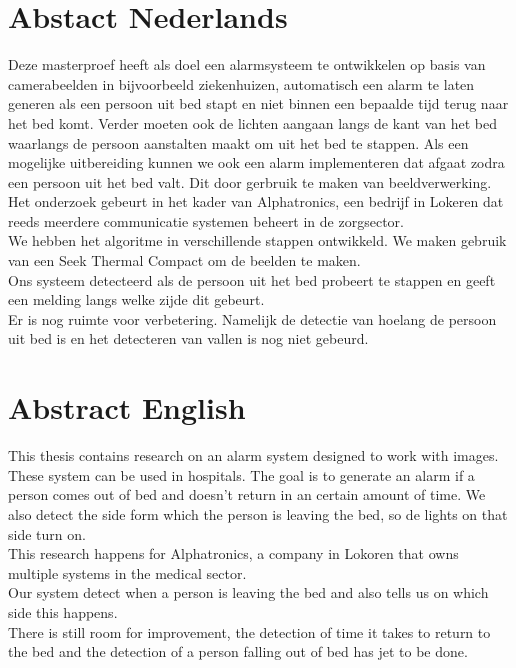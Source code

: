 \section{Abstact Nederlands}
Deze masterproef heeft als doel een alarmsysteem te ontwikkelen op basis van camerabeelden in bijvoorbeeld ziekenhuizen, automatisch een alarm te laten generen als een persoon uit bed stapt en niet binnen een bepaalde tijd terug naar het bed komt. Verder moeten ook de lichten aangaan langs de kant van het bed waarlangs de persoon aanstalten maakt om uit het bed te stappen.  Als een mogelijke uitbereiding kunnen we ook een alarm implementeren dat afgaat zodra een persoon uit het bed valt. Dit door gerbruik te maken van beeldverwerking.
Het onderzoek gebeurt in het kader van Alphatronics, een bedrijf in Lokeren dat reeds meerdere communicatie systemen beheert in de zorgsector.\\
 We hebben het algoritme in verschillende stappen ontwikkeld. We maken gebruik van een Seek Thermal Compact om de beelden te maken.\\
 Ons systeem detecteerd als de persoon uit het bed probeert te stappen en geeft een melding langs welke zijde dit gebeurt. \\
 Er is nog ruimte voor verbetering. Namelijk de detectie van hoelang de persoon uit bed is en het detecteren van vallen is nog niet gebeurd.\\
	
\section{Abstract English}	
This thesis contains research on an alarm system designed to work with images. These system can be used in hospitals. The goal is to generate an alarm if a person comes out of bed and doesn't return in an certain amount of time. We also detect the side form which the person is leaving the bed, so de lights on that side turn on. \\
This research happens for Alphatronics, a company in Lokoren that owns multiple systems in the medical sector. \\
Our system detect when a person is leaving the bed and also tells us on which side this happens. \\
There is still room for improvement, the detection of time it takes to return to the bed and the detection of a person falling out of bed has jet to be done.